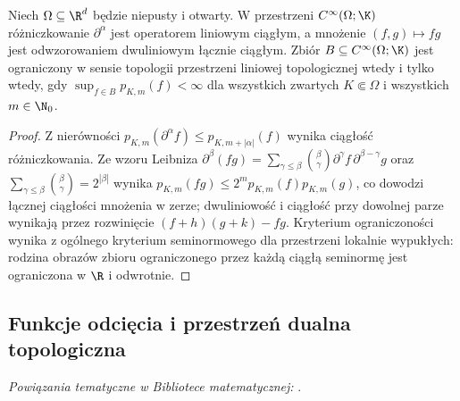 \begin{stwierdzenie}
\label{prop:operations-cinf17}
Niech $\Omega\subseteq\R^d$ będzie niepusty i otwarty.
W przestrzeni $C^\infty(\Omega;\K)$ różniczkowanie
$\partial^\alpha$ jest operatorem liniowym ciągłym,
a mnożenie $(f,g)\mapsto fg$ jest odwzorowaniem dwuliniowym
łącznie ciągłym. Zbiór $B\subseteq C^\infty(\Omega;\K)$
jest ograniczony w sensie topologii przestrzeni liniowej
topologicznej wtedy i tylko wtedy, gdy
$\sup_{f\in B}p_{K,m}(f)<\infty$ dla wszystkich zwartych
$K\Subset\Omega$ i wszystkich $m\in\N_0$.
\end{stwierdzenie}
\begin{proof}
Z nierówności $p_{K,m}(\partial^\alpha f)\le p_{K,m+|\alpha|}(f)$
wynika ciągłość różniczkowania. Ze wzoru Leibniza
$\partial^\beta(fg)=\sum_{\gamma\le\beta}\binom{\beta}{\gamma}
\partial^\gamma f\,\partial^{\beta-\gamma}g$
oraz $\sum_{\gamma\le\beta}\binom{\beta}{\gamma}=2^{|\beta|}$
wynika $p_{K,m}(fg)\le 2^m p_{K,m}(f)p_{K,m}(g)$,
co dowodzi łącznej ciągłości mnożenia w zerze;
dwuliniowość i ciągłość przy dowolnej parze wynikają przez
rozwinięcie $(f+h)(g+k)-fg$. Kryterium ograniczoności
wynika z ogólnego kryterium seminormowego dla przestrzeni
lokalnie wypukłych: rodzina obrazów zbioru ograniczonego przez
każdą ciągłą seminormę jest ograniczona w $\R$ i odwrotnie.
\end{proof}

\subsection{Funkcje odcięcia i przestrzeń dualna topologiczna}

\noindent\emph{Powiązania tematyczne w Bibliotece matematycznej:} .


